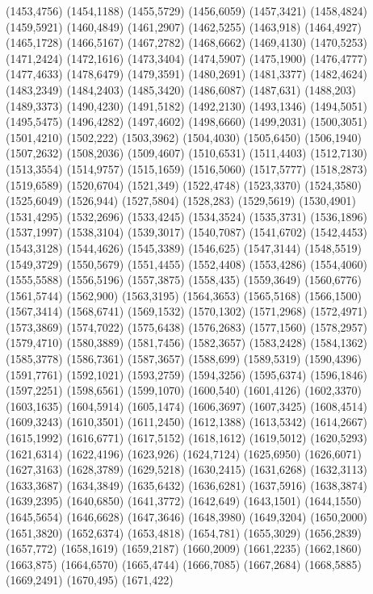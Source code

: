 (1453,4756)
(1454,1188)
(1455,5729)
(1456,6059)
(1457,3421)
(1458,4824)
(1459,5921)
(1460,4849)
(1461,2907)
(1462,5255)
(1463,918)
(1464,4927)
(1465,1728)
(1466,5167)
(1467,2782)
(1468,6662)
(1469,4130)
(1470,5253)
(1471,2424)
(1472,1616)
(1473,3404)
(1474,5907)
(1475,1900)
(1476,4777)
(1477,4633)
(1478,6479)
(1479,3591)
(1480,2691)
(1481,3377)
(1482,4624)
(1483,2349)
(1484,2403)
(1485,3420)
(1486,6087)
(1487,631)
(1488,203)
(1489,3373)
(1490,4230)
(1491,5182)
(1492,2130)
(1493,1346)
(1494,5051)
(1495,5475)
(1496,4282)
(1497,4602)
(1498,6660)
(1499,2031)
(1500,3051)
(1501,4210)
(1502,222)
(1503,3962)
(1504,4030)
(1505,6450)
(1506,1940)
(1507,2632)
(1508,2036)
(1509,4607)
(1510,6531)
(1511,4403)
(1512,7130)
(1513,3554)
(1514,9757)
(1515,1659)
(1516,5060)
(1517,5777)
(1518,2873)
(1519,6589)
(1520,6704)
(1521,349)
(1522,4748)
(1523,3370)
(1524,3580)
(1525,6049)
(1526,944)
(1527,5804)
(1528,283)
(1529,5619)
(1530,4901)
(1531,4295)
(1532,2696)
(1533,4245)
(1534,3524)
(1535,3731)
(1536,1896)
(1537,1997)
(1538,3104)
(1539,3017)
(1540,7087)
(1541,6702)
(1542,4453)
(1543,3128)
(1544,4626)
(1545,3389)
(1546,625)
(1547,3144)
(1548,5519)
(1549,3729)
(1550,5679)
(1551,4455)
(1552,4408)
(1553,4286)
(1554,4060)
(1555,5588)
(1556,5196)
(1557,3875)
(1558,435)
(1559,3649)
(1560,6776)
(1561,5744)
(1562,900)
(1563,3195)
(1564,3653)
(1565,5168)
(1566,1500)
(1567,3414)
(1568,6741)
(1569,1532)
(1570,1302)
(1571,2968)
(1572,4971)
(1573,3869)
(1574,7022)
(1575,6438)
(1576,2683)
(1577,1560)
(1578,2957)
(1579,4710)
(1580,3889)
(1581,7456)
(1582,3657)
(1583,2428)
(1584,1362)
(1585,3778)
(1586,7361)
(1587,3657)
(1588,699)
(1589,5319)
(1590,4396)
(1591,7761)
(1592,1021)
(1593,2759)
(1594,3256)
(1595,6374)
(1596,1846)
(1597,2251)
(1598,6561)
(1599,1070)
(1600,540)
(1601,4126)
(1602,3370)
(1603,1635)
(1604,5914)
(1605,1474)
(1606,3697)
(1607,3425)
(1608,4514)
(1609,3243)
(1610,3501)
(1611,2450)
(1612,1388)
(1613,5342)
(1614,2667)
(1615,1992)
(1616,6771)
(1617,5152)
(1618,1612)
(1619,5012)
(1620,5293)
(1621,6314)
(1622,4196)
(1623,926)
(1624,7124)
(1625,6950)
(1626,6071)
(1627,3163)
(1628,3789)
(1629,5218)
(1630,2415)
(1631,6268)
(1632,3113)
(1633,3687)
(1634,3849)
(1635,6432)
(1636,6281)
(1637,5916)
(1638,3874)
(1639,2395)
(1640,6850)
(1641,3772)
(1642,649)
(1643,1501)
(1644,1550)
(1645,5654)
(1646,6628)
(1647,3646)
(1648,3980)
(1649,3204)
(1650,2000)
(1651,3820)
(1652,6374)
(1653,4818)
(1654,781)
(1655,3029)
(1656,2839)
(1657,772)
(1658,1619)
(1659,2187)
(1660,2009)
(1661,2235)
(1662,1860)
(1663,875)
(1664,6570)
(1665,4744)
(1666,7085)
(1667,2684)
(1668,5885)
(1669,2491)
(1670,495)
(1671,422)
